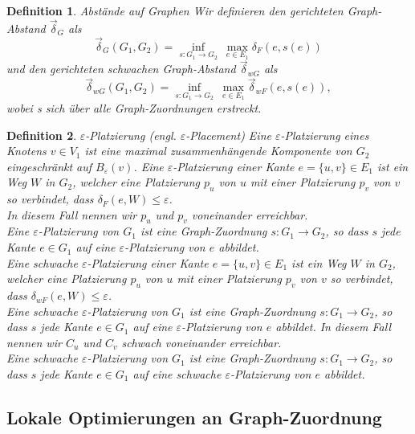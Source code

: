 \documentclass[a4paper, 12pt, twoside]{article}
\theoremstyle{Format1} %
\newtheorem{Def}{Definition}[section]       %
\begin{document}
\begin{Def}
	Abstände auf Graphen
	Wir definieren den \textit{gerichteten Graph-Abstand} $ \vec{\delta}_G $ als
	$$ \vec{\delta}_G(G_1,G_2) = \inf_{s: G_1 \to G_2} \: \max_{e \in E_1} \delta_F(e, s(e)) $$
	und den \textit{gerichteten schwachen Graph-Abstand} $ \vec{\delta}_{wG} $ als
	$$  \vec{\delta}_{wG}(G_1,G_2) = \inf_{s: G_1 \to G_2} \: \max_{e \in E_1} \vec{\delta}_{wF}(e, s(e)), $$
	wobei s sich über alle Graph-Zuordnungen erstreckt.
\end{Def}

\begin{Def}
	$\varepsilon$-Platzierung (engl. $\varepsilon$-Placement)
	Eine \textit{$\varepsilon$-Platzierung eines Knotens $v \in V_1$} ist eine maximal zusammenhängende Komponente von $G_2$ eingeschränkt auf $B_{\varepsilon}(v)$.
	Eine \textit{$\varepsilon$-Platzierung einer Kante $e = \{u,v\} \in E_1$} ist ein Weg $W$ in $G_2$, welcher eine Platzierung $p_u$ von $u$ mit einer Platzierung $p_v$ von $v$
	so verbindet, dass $\delta_F(e, W) \leq \varepsilon$.
	\\
	In diesem Fall nennen wir $p_u$ und $p_v$ \textit{voneinander erreichbar}.
	\\
	Eine \textit{$\varepsilon$-Platzierung von $G_1$} ist eine Graph-Zuordnung $s: G_1 \to G_2$, so dass $s$ jede Kante $e \in G_1$ auf eine $\varepsilon$-Platzierung von $e$ abbildet.
	\\
	Eine schwache $\varepsilon$-Platzierung einer Kante $e = \{u,v\} \in E_1$ ist ein Weg $W$ in $G_2$, welcher eine Platzierung $p_u$ von $u$ mit einer Platzierung $p_v$ von $v$
	so verbindet, dass $\delta_{wF}(e, W) \leq \varepsilon$.
	\\
	Eine schwache \textit{$\varepsilon$-Platzierung von $G_1$} ist eine Graph-Zuordnung $s: G_1 \to G_2$, so dass $s$ jede Kante $e \in G_1$ auf eine $\varepsilon$-Platzierung von $e$ abbildet.
	In diesem Fall nennen wir $C_u$ und $C_v$ \textit{schwach voneinander erreichbar}.
	\\
	Eine schwache \textit{$\varepsilon$-Platzierung von $G_1$} ist eine Graph-Zuordnung $s: G_1 \to G_2$, so dass $s$ jede Kante $e \in G_1$ auf eine schwache $\varepsilon$-Platzierung von $e$ abbildet.
\end{Def}

\subsection{Lokale Optimierungen an Graph-Zuordnung}
\end{document}
